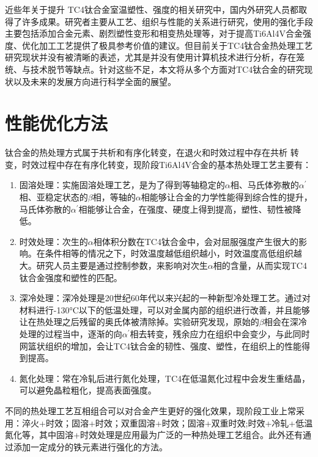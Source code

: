 \documentclass[
class = book,
zihao = -4,
font = noto,
paper = a4paper,
openany
]{easybook}
\newcommand{\ti}{Ti6Al4V}
\begin{document}
近些年关于提升 TC4钛合金室温塑性、强度的相关研究中，国内外研究人员都取得了许多成果。研究者主要从工艺、组织与性能的关系进行研究，使用的强化手段主要包括添加合金元素、剧烈塑性变形和相变热处理等，对于提高\ti 合金强度、优化加工工艺提供了极具参考价值的建议。但目前关于TC4钛合金热处理工艺研究现状并没有被清晰的表述，尤其是并没有使用计算机技术进行分析，存在笼统、与技术脱节等缺点。针对这些不足，本文将从多个方面对TC4钛合金的研究现状以及未来的发展方向进行科学全面的展望。

\section{性能优化方法}
钛合金的热处理方式属于共析和有序化转变，在退火和时效过程中存在共析 转变，时效过程中存在有序化转变，现阶段\ti 合金的基本热处理工艺主要有：
\begin{enumerate}
	\item 固溶处理：实施固溶处理工艺，是为了得到等轴稳定的$\alpha $相、马氏体弥散的$ \alpha ^{\prime} $相、亚稳定状态的$\beta $相，等轴的$\alpha $相能够让合金的力学性能得到综合性的提升，马氏体弥散的$ \alpha ^{\prime} $相能够让合金，在强度、硬度上得到提高，塑性、韧性被降低\cite{gurong2002}。
	\item 时效处理：次生的$\alpha $相体积分数在TC4钛合金中，会对屈服强度产生很大的影响。在条件相等的情况之下，时效温度越低组织越小，时效温度高低组织越大。研究人员主要是通过控制参数，来影响对次生$\alpha $相的含量，从而实现TC4钛合金强度和塑性的匹配。
	\item 深冷处理：深冷处理是20世纪60年代以来兴起的一种新型冷处理工艺。通过对材料进行-130°C以下的低温处理，可以对金属内部的组织进行改善，并且能够让在热处理之后残留的奥氏体被清除掉。实验研究发现，原始的$\beta $相会在深冷处理的过程当中，逐渐的向$\alpha^{\prime} $相去转变，残余应力在组织中会变少，与此同时网篮状组织的增加，会让TC4钛合金的韧性、强度、塑性，在组织上的性能得到提高。
	\item 氮化处理：常在冷轧后进行氮化处理，TC4在低温氮化过程中会发生重结晶，可以避免晶粒粗化，提高表面强度\cite{guotanliuMicrostructureEvolutionTi2022}。
\end{enumerate}
不同的热处理工艺互相组合可以对合金产生更好的强化效果，现阶段工业上常采用\cite{zhoukaixiangJiyushenlengchulidenanjiagongcailiaoqiexiaotexingyanjiu2022}：淬火+时效；固溶+时效；双重固溶+时效；固溶+双重时效;时效+冷轧+低温氮化等，其中固溶+时效处理是应用最为广泛的一种热处理工艺组合。此外还有通过添加一定成分的铁元素进行强化的方法\cite{yuliaoMicrostructuralStrengtheningToughening2022}。
\end{document}
